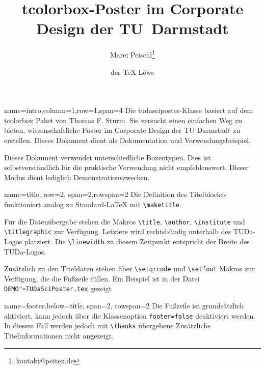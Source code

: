 \documentclass[
	accentcolor=9c,
	]{tudasciposter}
\newcommand{\tbs}{\textbackslash}
\let\code\texttt
\newcommand*{\macro}[1]{\code{\tbs#1}}
\let\file\texttt
\let\pck\textsf
\let\cls\textsf
\begin{document}
\title{\pck{tcolorbox}-Poster im Corporate Design der TU~Darmstadt}
\author{Marei Peischl\thanks{kontakt@peitex.de} \and der \TeX-Löwe}


\begin{tcbposter}[
	poster={
		columns=4,
		rows=7,
		spacing=1cm,
	},]
	
	\begin{posterboxenv}[title=Zusammenfassung]{name=intro,column=1,row=1,span=4}
	Die \cls{tudasciposter}-Klasse basiert auf dem \pck{tcolorbox} Paket von Thomas F. Sturm.
	Sie versucht einen einfachen Weg zu bieten, wissenschaftliche Poster im Corporate Design der TU Darmstadt zu erstellen. Dieses Dokument dient als Dokumentation und Verwendungsbeispiel.
	
	Dieses Dokument verwendet unterschiedliche Boxentypen. Dies ist selbstverständlich für die praktische Verwendung nicht empfehlenswert. Dieser Modus dient lediglich Demonstrationszwecken.
	\end{posterboxenv}

	\begin{posterboxenv}[title=Titelei]{name=title, row=2, span=2,rowspan=2}
	Die Definition des Titelblockes funktioniert analog zu Standard-\LaTeX{} mit \macro{maketitle}.
	
	Für die Datenübergabe stehen die Makros \macro{title}, \macro{author}, \macro{institute} und \macro{titlegraphic} zur Verfügung. Letztere wird rechtsbündig  unterhalb des TUDa-Logos platziert. Die \macro{linewidth} zu diesem Zeitpunkt entspricht der Breite des TUDa-Logos.
	
	Zusätzlich zu den Titeldaten stehen über \macro{setqrcode} und \macro{setfoot} Makros zur Verfügung, die die Fußzeile füllen.
	Ein Beispiel ist in der Datei \file{DEMO"=TUDaSciPoster.tex} gezeigt
	\end{posterboxenv}

\begin{posterboxenv}[title=Fußzeile]{name=footer,below=title, span=2, rowspan=2 }
	Die Fußzeile ist grundsätzlich aktiviert, kann jedoch über die Klassenoption \code{footer=false} deaktiviert werden. In diesem Fall werden jedoch mit \macro{thanks} übergebene Zusätzliche Titelinformationen nicht angezeigt.
	

\end{posterboxenv}
\end{tcbposter}
\end{document}

